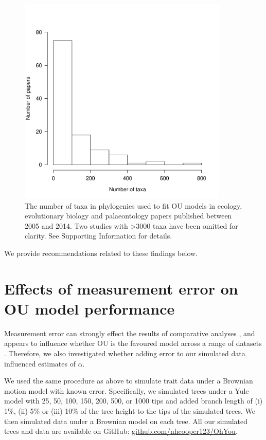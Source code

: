 \documentclass[a4paper,12pt]{article}
\begin{document}
    \begin{figure}[!htbp]
      \centering
      \includegraphics[width=10cm, height=10cm, keepaspectratio=true]{Figures/OhYou_Figure3.pdf}
      \caption{The number of taxa in phylogenies used to fit OU models in ecology, evolutionary biology and palaeontology papers published between 2005 and 2014. Two studies with \textgreater 3000 taxa have been omitted for clarity. See Supporting Information for details.
      }
      \label{figure:ntaxa}
\end{figure} 

    We provide recommendations related to these findings below.

\section{Effects of measurement error on OU model performance}
  Measurement error can strongly effect the results of comparative analyses \citep{silvestro2015}, and appears to influence whether OU is the favoured model across a range of datasets \citep[see][]{pennell2015model}. 
  Therefore, we also investigated whether adding error to our simulated data influenced estimates of $\alpha$.
  
  We used the same procedure as above to simulate trait data under a Brownian motion model with known error. 
  Specifically, we simulated trees under a Yule model with 25, 50, 100, 150, 200, 500, or 1000 tips and added branch length of (i) 1\%, (ii) 5\% or (iii) 10\% of the tree height to the tips of the simulated trees. 
  We then simulated data under a Brownian model on each tree. 
  All our simulated trees and data are available on GitHub: \href{https://github.com/nhcooper123/OhYou}{github.com/nhcooper123/OhYou}.
\end{document}
